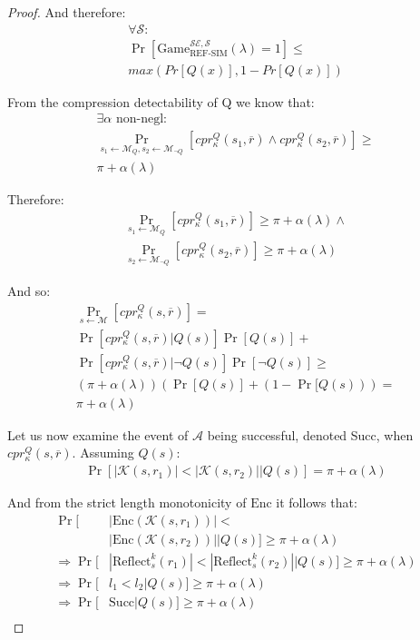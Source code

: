 \begin{proof}
And therefore:
\begin{align*}
    \forall \mathcal{S}:\\
    \Pr[
        \text{Game}_{\text{REF-SIM}}^{\mathcal{SE},\mathcal{S}}
        (\lambda) = 1
    ]
    \leq\\
    max(Pr[Q(x)], 1 - Pr[Q(x)])
\end{align*}

From the compression detectability of Q we know that:
\begin{align*}
    \exists \alpha \text{ non-negl}:\\
    \Pr_{s_1 \leftarrow \mathcal{M}_Q,
         s_2 \leftarrow \mathcal{M}_{\lnot Q}}
         [cpr^Q_{\kappa}(s_1, \overbar{r}) \land
          cpr^Q_{\kappa}(s_2, \overbar{r})]
    \geq\\
    \pi + \alpha(\lambda)
\end{align*}

Therefore:
\begin{align*}
    \Pr_{s_1 \leftarrow \mathcal{M}_Q}
         [cpr^Q_{\kappa}(s_1, \overbar{r})]
    \geq
    \pi + \alpha(\lambda) \land\\
    \Pr_{s_2 \leftarrow \mathcal{M}_{\lnot Q}}
         [cpr^Q_{\kappa}(s_2, \overbar{r})]
    \geq
    \pi + \alpha(\lambda)
\end{align*}

And so:
\begin{align*}
    \Pr_{s \leftarrow \mathcal{M}}
         [cpr^Q_{\kappa}(s, \overbar{r})]
    =\\
    \Pr[cpr^Q_{\kappa}(s, \overbar{r})|Q(s)]\Pr[Q(s)]
    +\\
    \Pr[cpr^Q_{\kappa}(s, \overbar{r})|\lnot Q(s)]\Pr[\lnot Q(s)]
    \geq\\
    (\pi + \alpha(\lambda))(\Pr[Q(s)] + (1 - \Pr[Q(s)))
    =\\
    \pi + \alpha(\lambda)
\end{align*}

Let us now examine the event of $\mathcal{A}$ being successful, denoted Succ,
when $cpr^Q_{\kappa}(s, \overbar{r})$. Assuming $Q(s)$:
\begin{align*}
    \Pr[|\mathcal{K}(s, r_1)| < |\mathcal{K}(s, r_2)||Q(s)]
    = \pi + \alpha(\lambda)
\end{align*}

And from the strict length monotonicity of $\textrm{Enc}$ it follows that:
\begin{align*}
    \Pr[&|\textrm{Enc}(\mathcal{K}(s, r_1))| <\\&|\textrm{Enc}(\mathcal{K}(s, r_2))||Q(s)]
        \geq \pi + \alpha(\lambda)\\
    \Rightarrow \Pr[&
        |\text{Reflect}^{k}_s(r_1)|
        <
        |\text{Reflect}^{k}_s(r_2)||Q(s)
    ]
        \geq \pi + \alpha(\lambda)\\
    \Rightarrow \Pr[&l_1 < l_2|Q(s)]
        \geq \pi + \alpha(\lambda)\\
    \Rightarrow \Pr[&\text{Succ}|Q(s)]
        \geq \pi + \alpha(\lambda)\\
\end{align*}


\end{proof}
